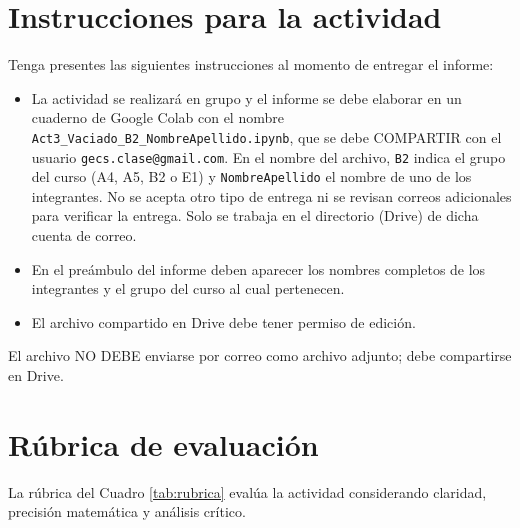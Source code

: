 \documentclass[oneside,letter,spanish,activeacute,english,links,10pt]{amcaGCS_EDO}
\begin{document}
\section{Instrucciones para la actividad}
Tenga presentes las siguientes instrucciones al momento de entregar el informe:
\begin{itemize}
	\item La actividad se realizará en grupo y el informe se debe elaborar en un cuaderno de Google Colab con el nombre
	\verb+Act3_Vaciado_B2_NombreApellido.ipynb+,
	que se debe COMPARTIR con el usuario \verb+gecs.clase@gmail.com+.
	En el nombre del archivo, \verb+B2+ indica el grupo del curso (A4, A5, B2 o E1) y \verb+NombreApellido+ el nombre de uno de los integrantes. No se acepta otro tipo de entrega ni se revisan correos adicionales para verificar la entrega. Solo se trabaja en el directorio (Drive) de dicha cuenta de correo.
	\item En el preámbulo del informe deben aparecer los nombres completos de los integrantes y el grupo del curso al cual pertenecen.
	\item El archivo compartido en Drive debe tener permiso de edición.
\end{itemize}

\bigskip{} El archivo NO DEBE enviarse por correo como archivo adjunto; debe compartirse en Drive.

\section{Rúbrica de evaluación}

La rúbrica del Cuadro \ref{tab:rubrica} evalúa la actividad considerando claridad, precisión matemática y análisis crítico.
\end{document}
